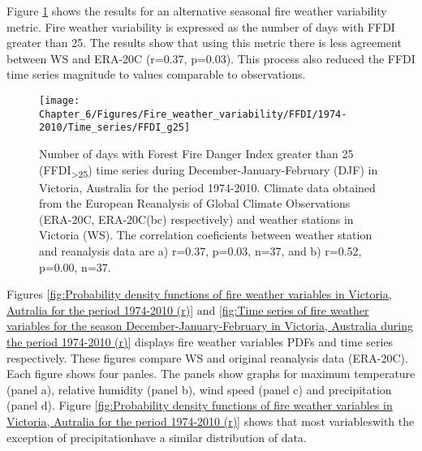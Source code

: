 Figure \ref{fig:Number of days with Forest Fire Danger Index greater than 25 time series during December-January-February in Victoria, Australia for the period 1974-2010 (r)}
shows the results for an alternative seasonal fire weather variability
metric. Fire weather variability is expressed as the number of days
with FFDI greater than 25. The results show that using this metric
there is less agreement between WS and ERA-20C (r=0.37, p=0.03). This
process also reduced the FFDI time series magnitude to values comparable
to observations.

\begin{figure}[h]
\noindent \begin{centering}
\texttt{[image: Chapter\_6/Figures/Fire\_weather\_variability/FFDI/1974-2010/Time\_series/FFDI\_g25]}
\par\end{centering}

\noindent \centering{}\caption[umber of days with Forest Fire Danger Index greater than 25 (FFDI\protect\textsubscript{>25})
time series during December-January-February (DJF) in Victoria, Australia
for the period 1974-2010]{Number of days with Forest Fire Danger Index greater than 25 (FFDI\protect\textsubscript{>25})
time series during December-January-February (DJF) in Victoria, Australia
for the period 1974-2010. Climate data obtained from the European
Reanalysis of Global Climate Observations (ERA-20C, ERA-20C(bc) respectively)
and weather stations in Victoria (WS). The correlation coeficients
between weather station and reanalysis data are a) r=0.37, p=0.03,
n=37, and b) r=0.52, p=0.00, n=37. \label{fig:Number of days with Forest Fire Danger Index greater than 25 time series during December-January-February in Victoria, Australia for the period 1974-2010 (r)}}
\end{figure}


Figures \ref{fig:Probability density functions of fire weather variables in Victoria, Autralia for the period 1974-2010 (r)}
and \ref{fig:Time series of fire weather variables for the season December-January-February in Victoria, Australia during the period 1974-2010 (r)}
displays fire weather variables PDFs and time series respectively.
These figures compare WS and original reanalysis data (ERA-20C). Each
figure shows four panles. The panels show graphs for maximum temperature
(panel a), relative humidity (panel b), wind speed (panel c) and precipitation
(panel d). Figure \ref{fig:Probability density functions of fire weather variables in Victoria, Autralia for the period 1974-2010 (r)}
shows that most variables\textemdash with the exception of precipitation\textemdash have
a similar distribution of data. 

